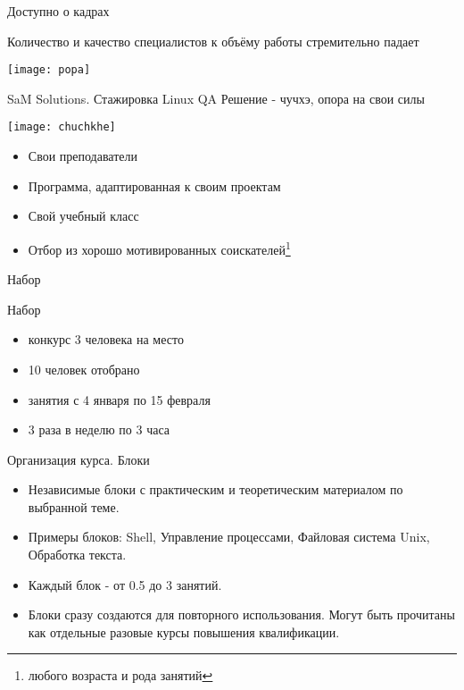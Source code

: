 \begin{frame}[fragile]{Доступно о кадрах}
 
  \begin{center}
    \Large Количество и качество \newline специалистов к объёму работы \newline стремительно падает 

    \texttt{[image: popa]}
  \end{center}

\end{frame}

\begin{frame}{SaM Solutions. Стажировка Linux QA}
  \alert{Решение - чучхэ, опора на свои силы}
  
  \center\texttt{[image: chuchkhe]}

  \begin{itemize}
    \item Свои преподаватели
    \item Программа, адаптированная к своим проектам
    \item Свой учебный класс
    \item Отбор из хорошо мотивированных соискателей\footnote{любого возраста и рода занятий}
  \end{itemize} 


\end{frame}

\begin{frame}{Набор}


  \alert{Набор}
  \begin{itemize}
    \item конкурс 3 человека на место
    \item 10 человек отобрано
    \item занятия с 4 января по 15 февраля
    \item 3 раза в неделю по 3 часа
  \end{itemize}

\end{frame}

\begin{frame}{Организация курса. Блоки}
  
  \begin{itemize}
    \item Независимые блоки с практическим и теоретическим материалом по выбранной теме.
    \item Примеры блоков: Shell, Управление процессами, Файловая система Unix, Обработка текста.
    \item Каждый блок - от 0.5 до 3 занятий.
    \item Блоки сразу создаются для повторного использования.  \newline
      Могут быть прочитаны как отдельные разовые курсы повышения квалификации.
  \end{itemize}

\end{frame}


